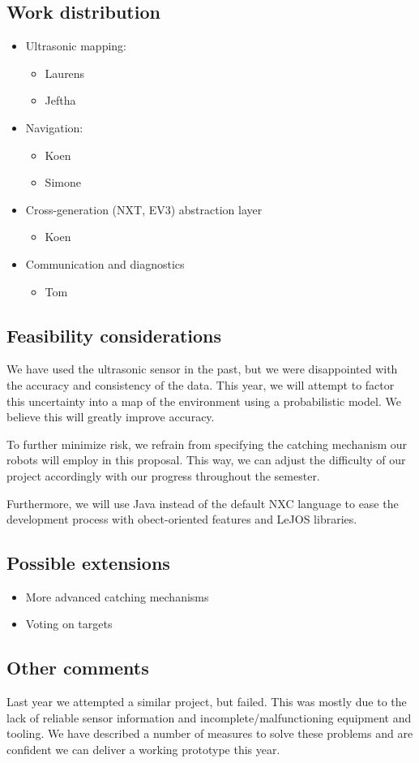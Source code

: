 \documentclass[a4paper]{article}
\begin{document}
\subsection*{Work distribution}
\begin{itemize}
	\item Ultrasonic mapping:
	\begin{itemize}
		\item Laurens
		\item Jeftha
	\end{itemize}
	\item Navigation:
	\begin{itemize}
		\item Koen
		\item Simone
	\end{itemize}
	\item Cross-generation (NXT, EV3) abstraction layer
	\begin{itemize}
		\item Koen
	\end{itemize}
	\item Communication and diagnostics
	\begin{itemize}
		\item Tom
	\end{itemize} 
\end{itemize}

\subsection*{Feasibility considerations}
We have used the ultrasonic sensor in the past, but we were disappointed with the accuracy and consistency of the data. This year, we will attempt to factor this uncertainty into a map of the environment using a probabilistic model. We believe this will greatly improve accuracy.

To further minimize risk, we refrain from specifying the catching mechanism our robots will employ in this proposal. This way, we can adjust the difficulty of our project accordingly with our progress throughout the semester.

Furthermore, we will use Java instead of the default NXC language to ease the development process with obect-oriented features and LeJOS libraries.

\subsection*{Possible extensions}
\begin{itemize}
	\item More advanced catching mechanisms
	\item Voting on targets 
\end{itemize}

\subsection*{Other comments}
Last year we attempted a similar project, but failed. This was mostly due to the lack of reliable sensor information and incomplete/malfunctioning equipment and tooling. We have described a number of measures to solve these problems and are confident we can deliver a working prototype this year.
\end{document}
